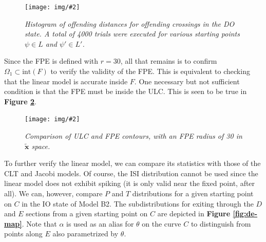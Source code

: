 \documentclass[letterpaper,12pt]{article}
\numberwithin{table}{section}
\numberwithin{figure}{section}
\numberwithin{equation}{section}
\newcommand{\centerfig}[2]{\begin{center}\texttt{[image: img/\#2]}\end{center}}
\newcommand{\ccaption}[1]{\caption{\textit{#1}}}
\newcommand{\reffig}[1]{\textbf{Figure \ref{#1}}}
\begin{document}
\begin{flushleft}
    \begin{figure}[h]

        \centering
 
        \centerfig{0.8}{off-dist.jpg}
    
        \captionsetup{width=0.75\linewidth}
        \ccaption{Histogram of offending distances for offending crossings in the DO state. A total of 4000 trials were executed for various starting points $\psi \in L$ and $\psi' \in L'$.}
        \label{fig:off-dist}
    
    \end{figure}

    Since the FPE is defined with $r = 30$, all that remains is to confirm $\Omega_1 \subset \text{int}(F)$ to verify the validity of the FPE. This is equivalent to checking that the linear model is accurate inside $F$. One necessary but not sufficient condition is that the FPE must be inside the ULC. This is seen to be true in \reffig{fig:fpe-ulc}.
    \begin{figure}[h]

        \centering
 
        \centerfig{0.8}{fpe-ulc.jpg}
    
        \captionsetup{width=0.7\linewidth}
        \ccaption{Comparison of ULC and FPE contours, with an FPE radius of 30 in $\tilde{\mathbf{x}}$ space.}
        \label{fig:fpe-ulc}
    
    \end{figure}
    
    To further verify the linear model, we can compare its statistics with those of the CLT and Jacobi models. Of course, the ISI distribution cannot be used since the linear model does not exhibit spiking (it is only valid near the fixed point, after all). We can, however, compare $P$ and $T$ distributions for a given starting point on $C$ in the IO state of Model B2. The subdistributions for exiting through the $D$ and $E$ sections from a given starting point on $C$ are depicted in \reffig{fig:de-map}. Note that $\alpha$ is used as an alias for $\theta$ on the curve $C$ to distinguish from points along $E$ also parametrized by $\theta$.
    \begin{figure}[!h]

        \centering


\end{figure}
\end{flushleft}
\end{document}

